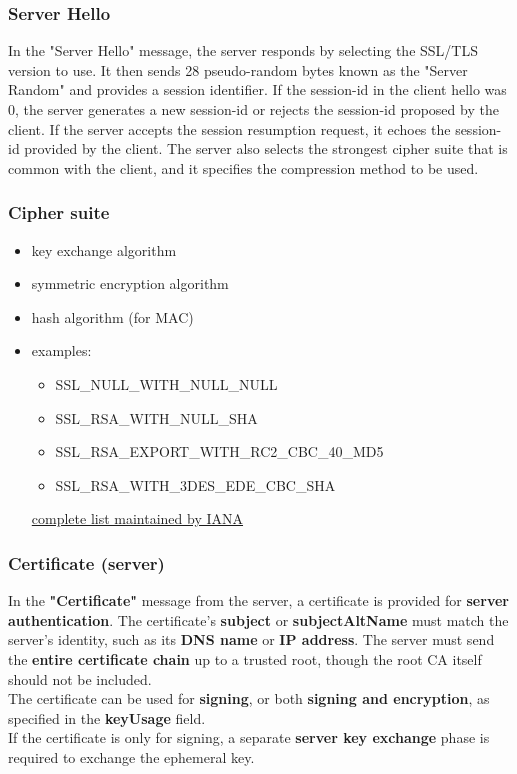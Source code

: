 \subsubsection{Server Hello}

In the "Server Hello" message, the server responds by selecting the SSL/TLS version to use. It then sends 28 pseudo-random bytes known as the "Server Random" and provides a session identifier. If the session-id in the client hello was 0, the server generates a new session-id or rejects the session-id proposed by the client. If the server accepts the session resumption request, it echoes the session-id provided by the client. The server also selects the strongest cipher suite that is common with the client, and it specifies the compression method to be used.

\subsubsection{Cipher suite}

\begin{itemize}[itemsep=0pt]
    \item key exchange algorithm
    \item symmetric encryption algorithm
    \item hash algorithm (for MAC)
    \item examples:
          \begin{itemize}[itemsep=0pt]
              \item SSL\_NULL\_WITH\_NULL\_NULL
              \item SSL\_RSA\_WITH\_NULL\_SHA
              \item SSL\_RSA\_EXPORT\_WITH\_RC2\_CBC\_40\_MD5
              \item SSL\_RSA\_WITH\_3DES\_EDE\_CBC\_SHA
          \end{itemize}
          \href{https://www.iana.org/assignments/tls-parameters/tls-parameters.xhtml#tls-parameters-4}{complete list maintained by IANA}
\end{itemize}


\subsubsection{Certificate (server)}

In the \textbf{"Certificate"} message from the server, a certificate is provided for \textbf{server authentication}. The certificate's \textbf{subject} or \textbf{subjectAltName} must match the server's identity, such as its \textbf{DNS name} or \textbf{IP address}. The server must send the \textbf{entire certificate chain} up to a trusted root, though the root CA itself should not be included. \\ The certificate can be used for \textbf{signing}, or both \textbf{signing and encryption}, as specified in the \textbf{keyUsage} field. \\ If the certificate is only for signing, a separate \textbf{server key exchange} phase is required to exchange the ephemeral key.

